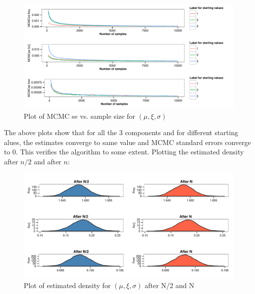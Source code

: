 \documentclass[12pt]{article}
\begin{document}
\begin{enumerate}[label=(\alph*)]
\begin{enumerate}[label=(\roman*)]
\begin{figure}[H]
\begin{centering}
\includegraphics{aua257HW3-012}
\caption{Plot of MCMC se vs. sample size for $(\mu,\xi,\sigma)$}
\end{centering}
\end{figure}
The above plots show that for all the 3 components and for different starting alues, the estimates converge to same value and MCMC standard errors converge to 0. This verifies the algorithm to some extent.
\clearpage
Plotting the estimated density after $n/2$ and after $n$:
\begin{figure}[H]
\begin{centering}
\includegraphics{aua257HW3-013}
\caption{Plot of estimated density for $(\mu,\xi,\sigma)$ after N/2 and N}
\end{centering}
\end{figure}


\end{enumerate}
\end{enumerate}
\end{document}
